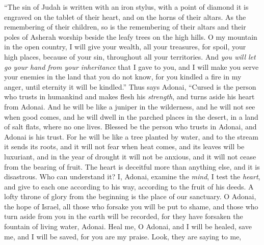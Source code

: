 \begin{biblechapter} %
 “The sin of Judah is written with an iron stylus, 
with a point of diamond it is engraved 
on the tablet of their heart, 
and on the horns of their altars.
\verse As the remembering of their children, 
so is the remembering of their altars 
and their poles of Asherah worship 
beside the leafy trees on the high hills.
\verse O my mountain in the open country, 
I will give your wealth, all your treasures, for spoil, 
your high places, because of your sin, 
throughout all your territories.
\verse And \textit{you will let go your hand from your inheritance} 
that I gave to you, 
and I will make you serve your enemies 
in the land that you do not know, 
for you kindled a fire in my anger, 
until eternity it will be kindled.”
 Thus says Adonai,
\verse “Cursed is the person who trusts in humankind 
and makes flesh his \textit{strength}, 
and turns aside his heart from Adonai.
\verse And he will be like a juniper in the wilderness, 
and he will not see when good comes, 
and he will dwell in the parched places in the desert, 
in a land of salt flats, where no one lives.
\verse Blessed be the person who trusts in Adonai, 
and Adonai is his trust.
\verse For he will be like a tree planted by water, 
and to the stream it sends its roots, 
and it will not fear when heat comes, 
and its leaves will be luxuriant, 
and in the year of drought it will not be anxious, 
and it will not cease from the bearing of fruit.
\verse The heart is deceitful more than anything else, 
and it is disastrous. Who can understand it?
\verse I, Adonai, examine the \textit{mind}, 
I test the \textit{heart}, 
and give to each one according to his way, 
according to the fruit of his deeds.
 A lofty throne of glory from the beginning 
is the place of our sanctuary.
\verse O Adonai, the hope of Israel, 
all those who forsake you will be put to shame, 
and those who turn aside from you in the earth will be recorded, 
for they have forsaken the fountain of living water, Adonai.
\verse Heal me, O Adonai, and I will be healed, 
save me, and I will be saved, 
for you are my praise.
\verse Look, they are saying to me, 

\end{biblechapter}
